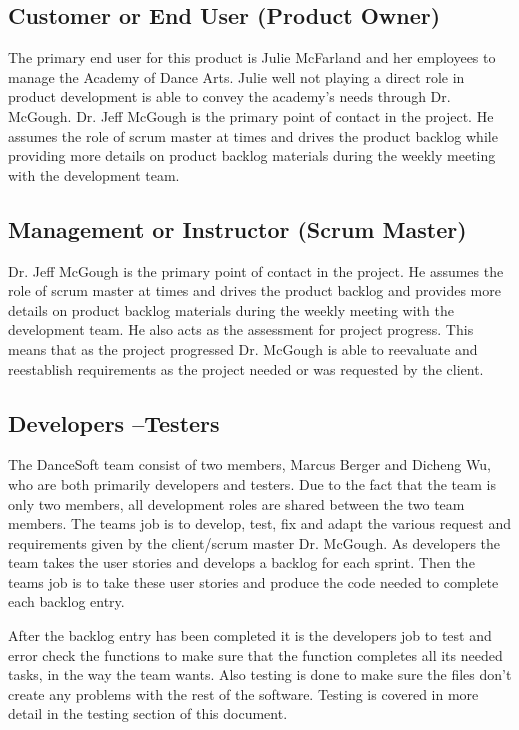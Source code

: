\subsection{Customer or End User (Product Owner)}
The primary end user for this product is Julie McFarland and her employees to manage the Academy of Dance Arts. Julie well not playing a direct role in product development is able to convey the academy's needs through Dr. McGough. Dr. Jeff McGough is the primary point of contact in the project. He assumes the role of scrum master at times and drives the product backlog while providing more details on product backlog materials during the weekly meeting with the development team. 

\subsection{Management or Instructor (Scrum Master)}
Dr. Jeff McGough is the primary point of contact in the project. He assumes the role of scrum master at times and drives the product backlog and provides more details on product backlog materials during the weekly meeting with the development team. He also acts as the assessment for project progress. This means that as the project progressed Dr. McGough is able to reevaluate and reestablish requirements as the project needed or was requested by the client. 


\subsection{Developers --Testers}
The DanceSoft team consist of two members, Marcus Berger and Dicheng Wu, who are both primarily developers and testers. Due to the fact that the team is only two members, all development roles are shared between the two team members. The teams job is to develop, test, fix and adapt the various request and requirements given by the client/scrum master Dr. McGough. As developers the team takes the user stories and develops a backlog for each sprint. Then the teams job is to take these user stories and produce the code needed to complete each backlog entry.

After the backlog entry has been completed it is the developers job to test and error check the functions to make sure that the function completes all its needed tasks, in the way the team wants. Also testing is done to make sure the files don't create any problems with the rest of the software. Testing is covered in more detail in the testing section of this document.

